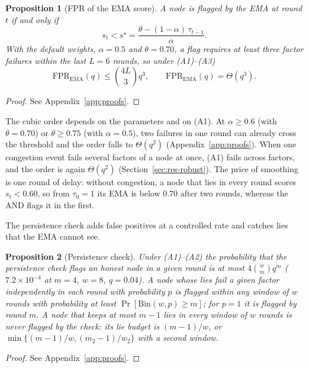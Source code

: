 \documentclass{ieeeaccess}
\newtheorem{proposition}{Proposition}
\begin{document}
\begin{proposition}[FPR of the EMA score]\label{prop:fpr_ema}
A node is flagged by the EMA at round $t$ if and only if
\begin{equation}
s_t < s^{\star}=\frac{\theta-(1-\alpha)\,\tau_{t-1}}{\alpha}.
\label{eq:sstar}
\end{equation}
With the default weights, $\alpha=0.5$ and $\theta=0.70$, a flag
requires at least three factor failures within the last $L=6$ rounds,
so under (A1)--(A3)
\begin{equation}
\mathrm{FPR}_{\mathrm{EMA}}(q) \le \binom{4L}{3}q^{3},\qquad
\mathrm{FPR}_{\mathrm{EMA}}(q)=\Theta(q^{3}).
\end{equation}
\end{proposition}
\begin{proof}
See Appendix~\ref{app:proofs}.
\end{proof}

The cubic order depends on the parameters and on (A1).  At
$\alpha\geq0.6$ (with $\theta=0.70$) or $\theta\geq0.75$ (with
$\alpha=0.5$), two failures in one round can already cross the
threshold and the order falls to $\Theta(q^{2})$
(Appendix~\ref{app:proofs}).  When one congestion event fails several
factors of a node at once, (A1) fails across factors, and the order is
again $\Theta(q^{2})$ (Section~\ref{sec:res-robust}).  The price of
smoothing is one round of delay: without congestion, a node that lies
in every round scores $s_t<0.60$, so from $\tau_0=1$ its EMA is below
$0.70$ after two rounds, whereas the AND flags it in the first.

The persistence check adds false positives at a controlled rate and
catches lies that the EMA cannot see.

\begin{proposition}[Persistence check]\label{prop:persist}
Under (A1)--(A2) the probability that the persistence check flags an
honest node in a given round is at most
$4\binom{w}{m}q^{m}$ ($7.2\times10^{-4}$ at $m=4$, $w=8$, $q=0.04$).
A node whose lies fail a given factor independently in each round with
probability $p$ is flagged within any window of $w$ rounds with
probability at least $\Pr[\mathrm{Bin}(w,p)\geq m]$; for $p=1$ it is
flagged by round $m$.  A node that keeps at most $m-1$ lies in every
window of $w$ rounds is never flagged by the check: its \emph{lie
budget} is $(m-1)/w$, or $\min\{(m-1)/w,(m_2-1)/w_2\}$ with a second
window.
\end{proposition}
\begin{proof}
See Appendix~\ref{app:proofs}.
\end{proof}
\end{document}
